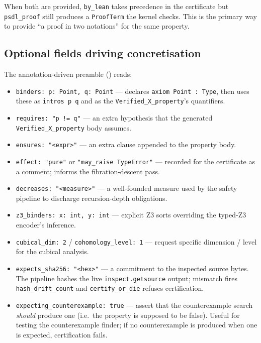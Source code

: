 When both are provided, \texttt{by\_lean} takes precedence in the
\Lean{} certificate but \texttt{psdl\_proof} still produces a
\texttt{ProofTerm} the kernel checks.  This is the primary way to
provide ``a proof in two notations'' for the same property.

\subsection{Optional fields driving concretisation}

The annotation-driven preamble () reads:

\begin{itemize}[leftmargin=1.7em]
  \item \texttt{binders: p: Point, q: Point} --- declares
    \texttt{axiom Point : Type}, then uses these as
    \texttt{intros p q} and as the \texttt{Verified\_X\_property}'s
    quantifiers.
  \item \texttt{requires: "p != q"} --- an extra hypothesis that the
    generated \texttt{Verified\_X\_property} body assumes.
  \item \texttt{ensures: "<expr>"} --- an extra clause appended to
    the property body.
  \item \texttt{effect: "pure"} or \texttt{"may\_raise TypeError"}
    --- recorded for the certificate as a comment; informs the
    fibration-descent pass.
  \item \texttt{decreases: "<measure>"} --- a well-founded measure
    used by the safety pipeline to discharge recursion-depth
    obligations.
  \item \texttt{z3\_binders: x: int, y: int} --- explicit Z3 sorts
    overriding the typed-Z3 encoder's inference.
  \item \texttt{cubical\_dim: 2} / \texttt{cohomology\_level: 1} ---
    request specific dimension / level for the cubical analysis.
  \item \texttt{expects\_sha256: "<hex>"} --- a commitment to the
    inspected source bytes.  The pipeline hashes the live
    \texttt{inspect.getsource} output; mismatch fires
    \texttt{hash\_drift\_count} and \texttt{certify\_or\_die}
    refuses certification.
  \item \texttt{expecting\_counterexample: true} --- assert that the
    counterexample search \emph{should} produce one (i.e.\ the
    property is supposed to be false).  Useful for testing the
    counterexample finder; if no counterexample is produced when one
    is expected, certification fails.
\end{itemize}

